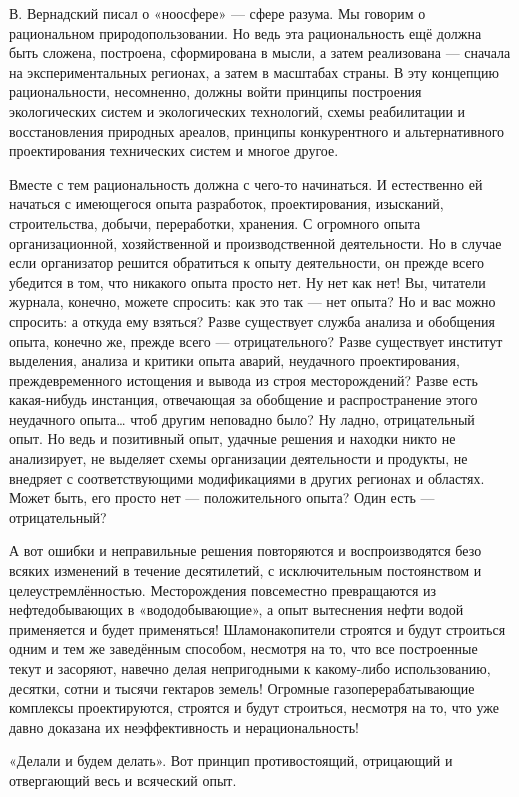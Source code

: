 \documentclass[11pt,a4paper]{article}
\begin{document}
В. Вернадский писал о «ноосфере» — сфере разума. Мы говорим о рациональном
природопользовании. Но ведь эта рациональность ещё должна быть сложена,
построена, сформирована в мысли, а затем реализована — сначала на
экспериментальных регионах, а затем в масштабах страны. В эту концепцию
рациональности, несомненно, должны войти принципы построения экологических
систем и экологических технологий, схемы реабилитации и восстановления
природных ареалов, принципы конкурентного и альтернативного проектирования
технических систем и многое другое. 

Вместе с тем рациональность должна с чего-то начинаться. И естественно ей
начаться с имеющегося опыта разработок, проектирования, изысканий,
строительства, добычи, переработки, хранения. С огромного опыта
организационной, хозяйственной и производственной деятельности. Но в случае
если организатор решится обратиться к опыту деятельности, он прежде всего
убедится в том, что никакого опыта просто нет. Ну нет как нет! Вы, читатели
журнала, конечно, можете спросить: как это так — нет опыта? Но и вас можно
спросить: а откуда ему взяться? Разве существует служба анализа и обобщения
опыта, конечно же, прежде всего — отрицательного? Разве существует институт
выделения, анализа и критики опыта аварий, неудачного проектирования,
преждевременного истощения и вывода из строя месторождений? Разве есть
какая-нибудь инстанция, отвечающая за обобщение и распространение этого
неудачного опыта… чтоб другим неповадно было? Ну ладно, отрицательный опыт. Но
ведь и позитивный опыт, удачные решения и находки никто не анализирует, не
выделяет схемы организации деятельности и продукты, не внедряет с
соответствующими модификациями в других регионах и областях. Может быть, его
просто нет — положительного опыта? Один есть — отрицательный? 

А вот ошибки и неправильные решения повторяются и воспроизводятся безо всяких
изменений в течение десятилетий, с исключительным постоянством и
целеустремлённостью. Месторождения повсеместно превращаются из нефтедобывающих
в «вододобывающие», а опыт вытеснения нефти водой применяется и будет
применяться! Шламонакопители строятся и будут строиться одним и тем же
заведённым способом, несмотря на то, что все построенные текут и засоряют,
навечно делая непригодными к какому-либо использованию, десятки, сотни и
тысячи гектаров земель! Огромные газоперерабатывающие комплексы проектируются,
строятся и будут строиться, несмотря на то, что уже давно доказана их
неэффективность и нерациональность!

«Делали и будем делать». Вот принцип противостоящий, отрицающий и отвергающий
весь и всяческий опыт. 
\end{document}
